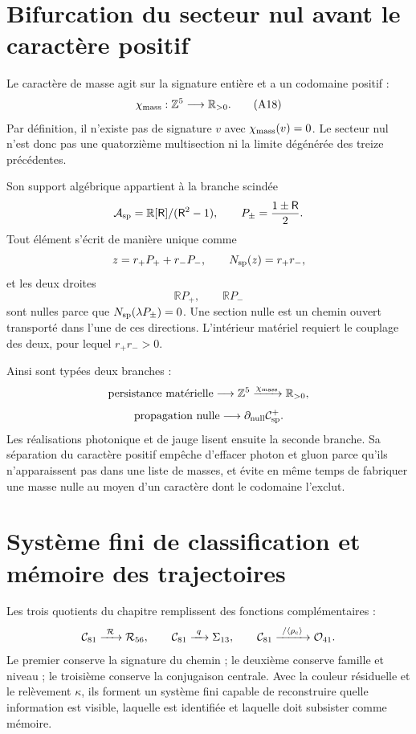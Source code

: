 \section{Bifurcation du secteur nul avant le caractère positif}

Le caractère de masse agit sur la signature entière et a un codomaine positif :
\[
 \chi_{\rm mass}:\mathbb Z^5\longrightarrow\mathbb R_{>0}.
 \tag{A18}\label{eq:caracter-positivo-atlas-rev6}
\]
Par définition, il n'existe pas de signature \(v\) avec
\(\chi_{\rm mass}(v)=0\). Le secteur nul n'est donc pas une
quatorzième multisection ni la limite dégénérée des treize précédentes.

Son support algébrique appartient à la branche scindée
\[
 \mathcal A_{\rm sp}
 =\mathbb R[\mathsf R]/(\mathsf R^2-1),
 \qquad
 P_\pm=\frac{1\pm\mathsf R}{2}.
\]
Tout élément s'écrit de manière unique comme
\[
 z=r_+P_++r_-P_-,
 \qquad
 N_{\rm sp}(z)=r_+r_-,
\]
et les deux droites
\[
 \mathbb R P_+,\qquad\mathbb R P_-
\]
sont nulles parce que \(N_{\rm sp}(\lambda P_\pm)=0\). Une section nulle est un
chemin ouvert transporté dans l'une de ces directions. L'intérieur matériel
requiert le couplage des deux, pour lequel \(r_+r_->0\).

Ainsi sont typées deux branches :
\[
 \text{persistance matérielle}
 \longrightarrow\mathbb Z^5
 \xrightarrow{\chi_{\rm mass}}\mathbb R_{>0},
\]
\[
 \text{propagation nulle}
 \longrightarrow\partial_{\rm null}\mathcal C_{\rm sp}^{+}.
\]
Les réalisations photonique et de jauge lisent ensuite la seconde branche. Sa
séparation du caractère positif empêche d'effacer photon et gluon parce qu'ils n'apparaissent pas
dans une liste de masses, et évite en même temps de fabriquer une masse nulle au moyen d'un
caractère dont le codomaine l'exclut.

\section{Système fini de classification et mémoire des trajectoires}

Les trois quotients du chapitre remplissent des fonctions complémentaires :
\[
 \mathcal C_{81}
 \xrightarrow{\ \mathcal R\ }\mathcal R_{56},
 \qquad
 \mathcal C_{81}
 \xrightarrow{\ q\ }\Sigma_{13},
 \qquad
 \mathcal C_{81}
 \xrightarrow{\ /\langle\rho_{\rm c}\rangle\ }
 \mathcal O_{41}.
\]
Le premier conserve la signature du chemin ; le deuxième conserve famille et niveau ;
le troisième conserve la conjugaison centrale. Avec la couleur résiduelle et le
relèvement \(\kappa\), ils forment un système fini capable de reconstruire
quelle information est visible, laquelle est identifiée et laquelle doit subsister comme
mémoire.

